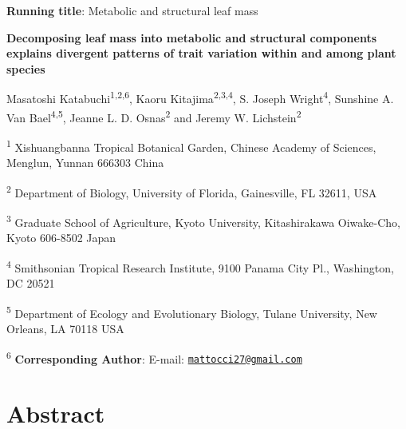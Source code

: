 \documentclass[
  12pt,
]{article}
\author{}
\date{\vspace{-2.5em}}
\begin{document}
\textbf{Running title}: Metabolic and structural leaf mass

\textbf{Decomposing leaf mass into metabolic and structural components explains divergent patterns of trait variation within and among plant species}

Masatoshi Katabuchi\textsuperscript{1,2,6}, Kaoru Kitajima\textsuperscript{2,3,4}, S. Joseph Wright\textsuperscript{4}, Sunshine A. Van Bael\textsuperscript{4,5}, Jeanne L. D. Osnas\textsuperscript{2} and Jeremy W. Lichstein\textsuperscript{2}

\textsuperscript{1} Xishuangbanna Tropical Botanical Garden, Chinese Academy of Sciences, Menglun, Yunnan 666303 China

\textsuperscript{2} Department of Biology, University of Florida, Gainesville, FL 32611, USA

\textsuperscript{3} Graduate School of Agriculture, Kyoto University, Kitashirakawa Oiwake-Cho, Kyoto 606-8502 Japan

\textsuperscript{4} Smithsonian Tropical Research Institute, 9100 Panama City Pl., Washington, DC 20521

\textsuperscript{5} Department of Ecology and Evolutionary Biology, Tulane University, New Orleans, LA 70118 USA

\textsuperscript{6} \textbf{Corresponding Author}: E-mail: \href{mailto:mattocci27@gmail.com}{\nolinkurl{mattocci27@gmail.com}}

\newpage

\hypertarget{abstract}{%
\section{Abstract}\label{abstract}}
\end{document}
